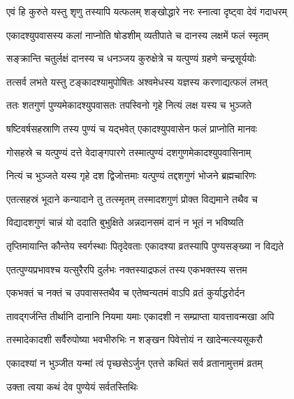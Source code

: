 \twolineshloka
{एवं हि कुरुते यस्तु शृणु तस्यापि यत्फलम्}
{शङ्खोद्धारे नरः स्नात्वा दृष्ट्वा देवं गदाधरम्} %

\twolineshloka
{एकादश्युपवासस्य कलां नाप्नोति षोडशीम्}
{व्यतीपाते च दानस्य लक्षमें फलं स्मृतम्} %

\twolineshloka
{सङ्क्रान्ति चतुर्लक्षं दानस्य च धनञ्जय}
{कुरुक्षेत्रे च यत्पुण्यं ग्रहणे चन्द्रसूर्ययोः} %

\twolineshloka
{तत्सर्व लभते यस्तु टङ्कादश्यामुपोषितः}
{अश्वमेधस्य यज्ञस्य करणाद्यत्फलं लभत्} %

\twolineshloka
{ततः शतगुणं पुण्यमेकादश्युपवासतः}
{तपस्विनो गृहे नित्यं लक्ष यस्य च भुञ्जते} %

\twolineshloka
{षष्टिवर्षसहस्राणि तस्य पुण्यं च यद्भवेत्}
{एकादश्युपवासेन फलं प्राप्नोति मानवः} %

\twolineshloka
{गोसहस्रे च यत्पुण्यं दत्ते वेदाङ्गपारगे}
{तस्मात्पुण्यं दशगुणमेकादश्युपवासिनाम्} %

\twolineshloka
{नित्यं च भुञ्जते यस्य गृहे दश द्विजोत्तमाः}
{यत्पुण्यं तद्दशगुणं भोजने ब्रह्मचारिणः} %

\twolineshloka
{एतत्सहस्रं भूदाने कन्यादाने तु तत्स्मृतम्}
{तस्मादशगुणं प्रोक्त विद्यमाने तथैव च} %

\twolineshloka
{विद्यादशगुणं चान्नं यो ददाति बुभुक्षिते}
{अन्नदानसमं दानं न भूतं न भविष्यति} %

\twolineshloka
{तृप्तिमायान्ति कौन्तेय स्वर्गस्थाः पितृदेवताः}
{एकादश्या व्रतस्यापि पुण्यसङ्ख्या न विद्यते} %

\twolineshloka
{एतत्पुण्यप्रभावश्च यत्सुरैरपि दुर्लभः}
{नक्तस्याद्रफलं तस्य एकभक्तस्य सत्तम} %

\twolineshloka
{एकभक्तं च नक्तं च उपवासस्तथैव च}
{एतेष्वन्यतमं वाऽपि व्रतं कुर्याद्धरोर्दन} %

\twolineshloka
{तावद्गर्जन्ति तीर्थानि दानानि नियमा यमाः}
{एकादशी न सम्प्राप्ता यावत्तावन्मखा अपि} %

\twolineshloka
{तस्मादेकादशी सर्वैरुपोष्या भवभीरुभिः}
{न शङ्खन पिवेत्तोयं न खादेन्मत्स्यसूकरौ} %

\twolineshloka
{एकादश्यां न भुञ्जीत यन्मां त्वं पृच्छसेऽर्जुन}
{एतत्ते कथितं सर्व व्रतानामुत्तमं व्रतम्} %



\onelineshloka
{उक्ता त्वया कथं देव पुण्येयं सर्वतस्तिथिः} %


